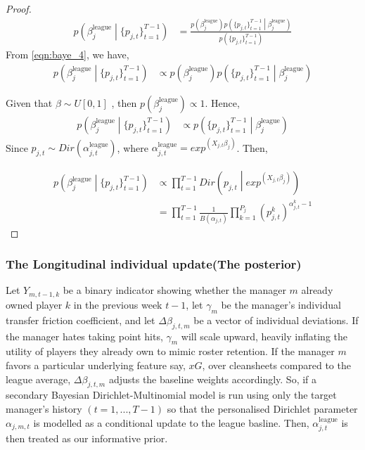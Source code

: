 				\begin{proof}
					\[
					\begin{aligned}
						p\left(\beta_j^{\text{league}} \middle| \{ p_{j,t}\}_{t=1}^{T-1}\right)
						& = \frac{p\left(\beta_j^{\text{league}}\right) p\left(\{ p_{j,t} \}_{t=1}^{T-1} \middle| \beta^{\text{league}}_j\right)}{p\left( \{ p_{j,t}\}_{t=1}^{T-1} \right)}
					\end{aligned}
					\]
					From \eqref{eqn:baye_4}, we have,
					\[
					\begin{aligned}
						p\left(\beta_j^{\text{league}} \middle| \{ p_{j,t}\}_{t=1}^{T-1}\right)
						 & \propto p\left(\beta_j^{\text{league}}\right) p\left(\{ p_{j,t} \}_{t=1}^{T-1} \middle| \beta^{\text{league}}_j\right)
					\end{aligned}
					\]

					Given that $\beta \sim U[0,1]$ , then $p\left(\beta_{j}^{\text{league}} \right) \propto 1$. Hence,
					\[
						\begin{aligned}
							p\left(\beta_j^{\text{league}} \middle| \{ p_{j,t}\}_{t=1}^{T-1}\right)
							& \propto p\left(\{ p_{j,t} \}_{t=1}^{T-1} \middle| \beta^{\text{league}}_j\right)
						\end{aligned}
					\]
					Since $p_{j,t} \sim Dir\left(\alpha^{\text{league}}_{j,t}\right)$, where $\alpha^{\text{league}}_{j,t} = exp^{\left(X_{j,t}\beta_{j}\right)}$. Then,

					\[
					\begin{aligned}
						p\left(\beta_j^{\text{league}} \middle| \{ p_{j,t}\}_{t=1}^{T-1}\right)
						& \propto \prod_{t=1}^{T-1} Dir\left( p_{j,t} \middle| exp^{\left(X_{j,t}\beta_{j}\right)}\right)\\
						& = \prod_{t=1}^{T-1} \frac{1}{B\left(\alpha_{j,t}\right)} \prod_{k=1}^{P_j}\left(p^k_{j,t}\right)^{\alpha^k_{j,t}-1}
					\end{aligned}
					\]\qedhere
				\end{proof}

				\subsubsection{The Longitudinal individual update(The posterior)}
				Let $Y_{m,t-1,k}$ be a binary indicator showing whether the manager $m$ already owned player $k$ in the previous week $t-1$, let $\gamma_m$ be the manager's individual transfer friction coefficient, and let $\Delta\beta_{j,t,m}$ be a vector of individual deviations. If the manager hates taking point hits, $\gamma_m$ will scale upward, heavily inflating the utility of players they already own to mimic roster retention. If the manager $m$ favors a particular underlying feature say, $xG$, over cleansheets compared to the league average, $\Delta\beta_{j,t,m}$ adjusts the baseline weights accordingly. So, if a secondary Bayesian Dirichlet-Multinomial model is run using only the target manager's history $(t=1, ..., T-1)$ so that the personalised Dirichlet parameter $\alpha_{j,m,t}$ is modelled as a conditional update to the league basline. Then, $\alpha_{j,t}^{\text{league}}$ is then treated as our informative prior.


